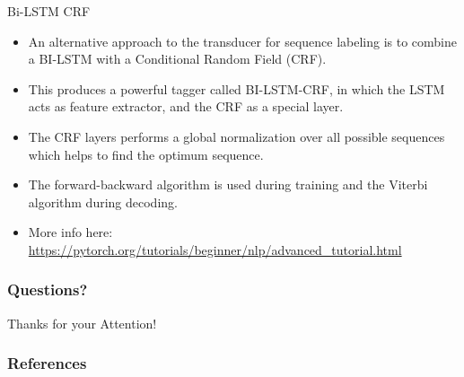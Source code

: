 \documentclass[handout]{beamer}
\begin{document}
\begin{frame}{Bi-LSTM CRF}
\begin{scriptsize}

\begin{itemize}

\item An alternative approach to the transducer for sequence labeling is to combine a BI-LSTM with a Conditional Random Field (CRF).
\item This produces a powerful tagger \cite{huang2015bidirectional} called BI-LSTM-CRF, in which the LSTM acts as feature extractor, and the CRF as a special layer.
\item The CRF layers performs a global normalization over all possible sequences which helps to find the optimum sequence.
\item The forward-backward algorithm is used during training and the Viterbi algorithm during decoding.

\item More info here: \url{https://pytorch.org/tutorials/beginner/nlp/advanced_tutorial.html}

\end{itemize}
\end{scriptsize}
\end{frame}



\begin{frame}
\frametitle{Questions?}
\begin{center}\LARGE Thanks for your Attention!\\ \end{center}



\end{frame}

\begin{frame}[allowframebreaks]\scriptsize
\frametitle{References}


%
\end{frame}  


\end{document}

